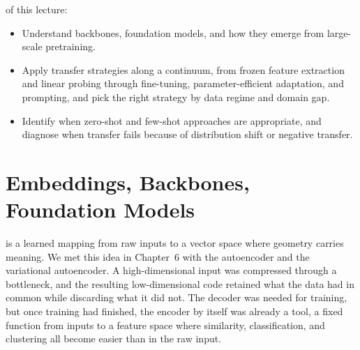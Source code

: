 
 of this lecture:
\begin{itemize}
    \item Understand backbones, foundation models, and how they emerge from large-scale pretraining.
    \item Apply transfer strategies along a continuum, from frozen feature extraction and linear probing through fine-tuning, parameter-efficient adaptation, and prompting, and pick the right strategy by data regime and domain gap.
    \item Identify when zero-shot and few-shot approaches are appropriate, and diagnose when transfer fails because of distribution shift or negative transfer.
\end{itemize}


\newpage




\section{Embeddings, Backbones, Foundation Models}


 is a learned mapping from raw inputs to a vector space where geometry carries meaning. We met this idea in Chapter~6 with the autoencoder and the variational autoencoder. A high-dimensional input was compressed through a bottleneck, and the resulting low-dimensional code retained what the data had in common while discarding what it did not. The decoder was needed for training, but once training had finished, the encoder by itself was already a tool, a fixed function from inputs to a feature space where similarity, classification, and clustering all become easier than in the raw input.

